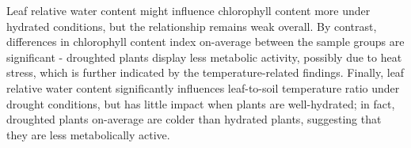 \documentclass{report}
\begin{document}
\hspace{24pt} Leaf relative water content might influence chlorophyll content more under hydrated conditions, but the relationship remains weak overall. By contrast, differences in chlorophyll content index on-average between the sample groups are significant - droughted plants display less metabolic activity, possibly due to heat stress, which is further indicated by the temperature-related findings. Finally, leaf relative water content significantly influences leaf-to-soil temperature ratio under drought conditions, but has little impact when plants are well-hydrated; in fact, droughted plants on-average are colder than hydrated plants, suggesting that they are less metabolically active.

\clearpage

\printbibliography
\end{document}

